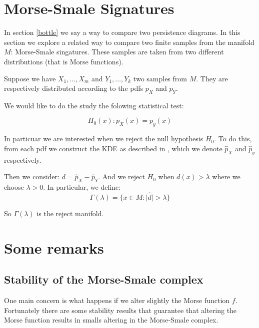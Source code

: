 \section{Morse-Smale Signatures}

In section \ref{bottle} we say a way to compare two persistence diagrams. In this section we explore a related way to compare
two finite samples from the manifold $M$:
Morse-Smale singatures.
These samples are taken from two different distributions (that is Morse functions).

Suppose we have $X_1,\ldots,X_m$ and $Y_1,\ldots,Y_k$ two samples from $M$.  
They are respectively distributed according to the pdfs $p_X$ and $p_Y$.

We would like to do the study the folowing statistical test:

$$
H_0(x):p_X(x)=p_y(x)
$$

In particuar we are interested when we reject the null hypothesis $H_0$.
To do this, from each pdf we construct the KDE as described in \label{kde},
which we denote $\hat p_X$ and $\hat p_y$ respectively.



Then we consider: $d=\hat p_X - \hat p_Y$.
And we reject $H_0$ when $d(x)>\lambda$ where we choose $\lambda>0$.
In particular, we define:
$$
\Gamma(\lambda)=
\{
    x\in M:
    \vert \hat d \vert > \lambda
\}
$$

So $\Gamma(\lambda)$ is the reject manifold.


\section{Some remarks}

\subsection{Stability of the Morse-Smale complex}

One main concern is what happens if we alter slightly the Morse function
$f$. Fortunately there are some stability results that guarantee that altering the 
Morse function results in smalls altering in the Morse-Smale complex.


